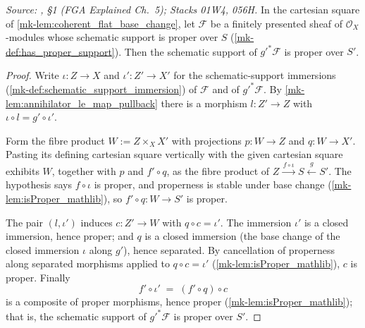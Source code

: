 \begin{lemma}\label{mk-lem:proper_support_base_change}
  \leanok

  \textit{Source: \cite{nitsure-hilbert-quot}, \S 1 (FGA Explained Ch.~5); Stacks 01W4, 056H.}
  In the cartesian square of \ref{mk-lem:coherent_flat_base_change}, let
  \(\mathcal{F}\) be a finitely presented sheaf of
  \(\mathcal{O}_X\)-modules whose schematic support is proper over \(S\)
  (\ref{mk-def:has_proper_support}).  Then the schematic support of
  \(g'^* \mathcal{F}\) is proper over \(S'\).
\end{lemma}
\begin{proof}
  \leanok{}
  Write \(\iota : Z \to X\) and \(\iota' : Z' \to X'\) for the
  schematic-support immersions (\ref{mk-def:schematic_support_immersion}) of
  \(\mathcal{F}\) and of \(g'^* \mathcal{F}\).  By
  \ref{mk-lem:annihilator_le_map_pullback} there is a morphism
  \(l : Z' \to Z\) with \(\iota \circ l = g' \circ \iota'\).

  Form the fibre product \(W := Z \times_X X'\) with projections
  \(p : W \to Z\) and \(q : W \to X'\).  Pasting its defining cartesian
  square vertically with the given cartesian square exhibits \(W\), together
  with \(p\) and \(f' \circ q\), as the fibre product of
  \(Z \xrightarrow{\,f \circ \iota\,} S \xleftarrow{\,g\,} S'\).  The
  hypothesis says \(f \circ \iota\) is proper, and properness is stable under
  base change (\ref{mk-lem:isProper_mathlib}), so \(f' \circ q : W \to S'\) is
  proper.

  The pair \((l, \iota')\) induces \(c : Z' \to W\) with
  \(q \circ c = \iota'\).  The immersion \(\iota'\) is a closed immersion,
  hence proper; and \(q\) is a closed immersion (the base change of the
  closed immersion \(\iota\) along \(g'\)), hence separated.  By cancellation
  of properness along separated morphisms applied to \(q \circ c = \iota'\)
  (\ref{mk-lem:isProper_mathlib}), \(c\) is proper.  Finally
  \[
    f' \circ \iota' \;=\; (f' \circ q) \circ c
  \]
  is a composite of proper morphisms, hence proper
  (\ref{mk-lem:isProper_mathlib}); that is, the schematic support of
  \(g'^* \mathcal{F}\) is proper over \(S'\).
\end{proof}

